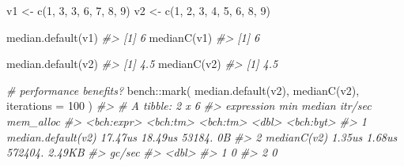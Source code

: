 \documentclass[
]{book}
\newenvironment{Shaded}{\begin{snugshade}}{\end{snugshade}}
\newcommand{\AttributeTok}[1]{\textcolor[rgb]{0.77,0.63,0.00}{#1}}
\newcommand{\CommentTok}[1]{\textcolor[rgb]{0.56,0.35,0.01}{\textit{#1}}}
\newcommand{\DecValTok}[1]{\textcolor[rgb]{0.00,0.00,0.81}{#1}}
\newcommand{\FunctionTok}[1]{\textcolor[rgb]{0.00,0.00,0.00}{#1}}
\newcommand{\NormalTok}[1]{#1}
\newcommand{\OtherTok}[1]{\textcolor[rgb]{0.56,0.35,0.01}{#1}}
\newcommand{\SpecialCharTok}[1]{\textcolor[rgb]{0.00,0.00,0.00}{#1}}
\begin{document}
\begin{Shaded}
\begin{Highlighting}[]
\NormalTok{v1 }\OtherTok{\textless{}{-}} \FunctionTok{c}\NormalTok{(}\DecValTok{1}\NormalTok{, }\DecValTok{3}\NormalTok{, }\DecValTok{3}\NormalTok{, }\DecValTok{6}\NormalTok{, }\DecValTok{7}\NormalTok{, }\DecValTok{8}\NormalTok{, }\DecValTok{9}\NormalTok{)}
\NormalTok{v2 }\OtherTok{\textless{}{-}} \FunctionTok{c}\NormalTok{(}\DecValTok{1}\NormalTok{, }\DecValTok{2}\NormalTok{, }\DecValTok{3}\NormalTok{, }\DecValTok{4}\NormalTok{, }\DecValTok{5}\NormalTok{, }\DecValTok{6}\NormalTok{, }\DecValTok{8}\NormalTok{, }\DecValTok{9}\NormalTok{)}

\FunctionTok{median.default}\NormalTok{(v1)}
\CommentTok{\#\textgreater{} [1] 6}
\FunctionTok{medianC}\NormalTok{(v1)}
\CommentTok{\#\textgreater{} [1] 6}

\FunctionTok{median.default}\NormalTok{(v2)}
\CommentTok{\#\textgreater{} [1] 4.5}
\FunctionTok{medianC}\NormalTok{(v2)}
\CommentTok{\#\textgreater{} [1] 4.5}

\CommentTok{\# performance benefits?}
\NormalTok{bench}\SpecialCharTok{::}\FunctionTok{mark}\NormalTok{(}
  \FunctionTok{median.default}\NormalTok{(v2),}
  \FunctionTok{medianC}\NormalTok{(v2),}
  \AttributeTok{iterations =} \DecValTok{100}
\NormalTok{)}
\CommentTok{\#\textgreater{} \# A tibble: 2 x 6}
\CommentTok{\#\textgreater{}   expression              min   median \textasciigrave{}itr/sec\textasciigrave{} mem\_alloc}
\CommentTok{\#\textgreater{}   \textless{}bch:expr\textgreater{}         \textless{}bch:tm\textgreater{} \textless{}bch:tm\textgreater{}     \textless{}dbl\textgreater{} \textless{}bch:byt\textgreater{}}
\CommentTok{\#\textgreater{} 1 median.default(v2)  17.47us  18.49us    53184.        0B}
\CommentTok{\#\textgreater{} 2 medianC(v2)          1.35us   1.68us   572404.    2.49KB}
\CommentTok{\#\textgreater{}   \textasciigrave{}gc/sec\textasciigrave{}}
\CommentTok{\#\textgreater{}      \textless{}dbl\textgreater{}}
\CommentTok{\#\textgreater{} 1        0}
\CommentTok{\#\textgreater{} 2        0}
\end{Highlighting}
\end{Shaded}


  
\end{document}
